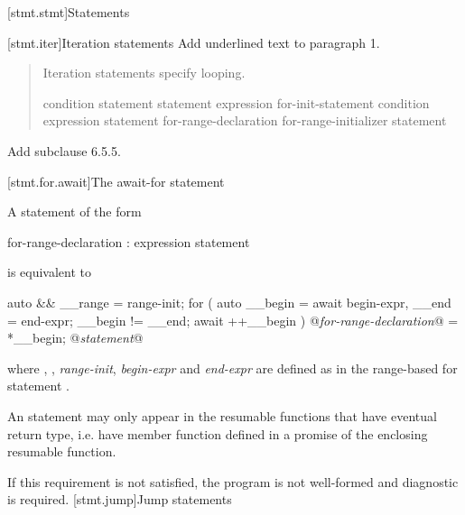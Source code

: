 
[stmt.stmt]{Statements}%

\setcounter{section}{4}
[stmt.iter]{Iteration statements}%
Add underlined text to paragraph 1.

\begin{quote}
\pnum
Iteration statements specify looping.

%
%
%
%
\begin{bnf}
	\br
	 condition \terminal{)} statement\br
	 statement  expression \terminal{) ;}\br
	 for-init-statement condition\opt \terminal{;} expression\opt \terminal{)} statement\br
	 for-range-declaration \terminal{:} for-range-initializer \terminal{)} statement\br
\end{bnf}
\end{quote}

Add subclause 6.5.5.

\setcounter{subsection}{4}
[stmt.for.await]{The await-for statement}%

\pnum
A  statement of the form

\begin{ncbnf}
	 for-range-declaration : expression \terminal{)} statement
\end{ncbnf}

is equivalent to

\begin{codeblock}
	{
		auto && __range = range-init;
		for ( auto __begin = await begin-expr,
		__end = end-expr;
		__begin != __end;
		await ++__begin ) {
			@\textit{for-range-declaration}@ = *__begin;
			@\textit{statement}@
		}
	}
\end{codeblock}

where , , 
\textit{range-init}, \textit{begin-expr} and \textit{end-expr} are defined as in the range-based for statement .

\pnum
An  statement may only appear in the resumable functions 
that have eventual return type, i.e. have  member
function defined in a promise of the enclosing resumable function.

If this requirement is not satisfied, the program is not well-formed and diagnostic is required.
\setcounter{section}{5}
[stmt.jump]{Jump statements}%

